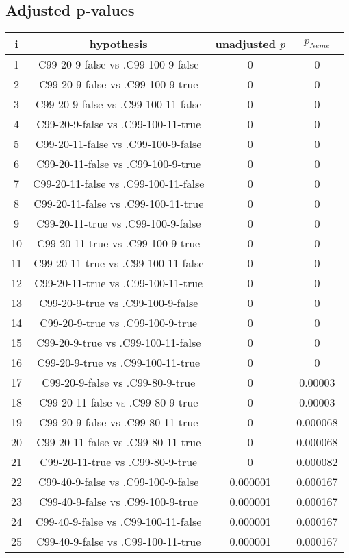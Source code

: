 \documentclass[a4paper,10pt]{article}
\begin{document}
\begin{landscape}
\pagebreak

\subsection{Adjusted p-values}

\begin{table}[!htp]
\centering\scriptsize
\begin{tabular}{cccc}
i&hypothesis&unadjusted $p$&$p_{Neme}$\\
\hline1&C99-20-9-false vs .C99-100-9-false&0&0\\
2&C99-20-9-false vs .C99-100-9-true&0&0\\
3&C99-20-9-false vs .C99-100-11-false&0&0\\
4&C99-20-9-false vs .C99-100-11-true&0&0\\
5&C99-20-11-false vs .C99-100-9-false&0&0\\
6&C99-20-11-false vs .C99-100-9-true&0&0\\
7&C99-20-11-false vs .C99-100-11-false&0&0\\
8&C99-20-11-false vs .C99-100-11-true&0&0\\
9&C99-20-11-true vs .C99-100-9-false&0&0\\
10&C99-20-11-true vs .C99-100-9-true&0&0\\
11&C99-20-11-true vs .C99-100-11-false&0&0\\
12&C99-20-11-true vs .C99-100-11-true&0&0\\
13&C99-20-9-true vs .C99-100-9-false&0&0\\
14&C99-20-9-true vs .C99-100-9-true&0&0\\
15&C99-20-9-true vs .C99-100-11-false&0&0\\
16&C99-20-9-true vs .C99-100-11-true&0&0\\
17&C99-20-9-false vs .C99-80-9-true&0&0.00003\\
18&C99-20-11-false vs .C99-80-9-true&0&0.00003\\
19&C99-20-9-false vs .C99-80-11-true&0&0.000068\\
20&C99-20-11-false vs .C99-80-11-true&0&0.000068\\
21&C99-20-11-true vs .C99-80-9-true&0&0.000082\\
22&C99-40-9-false vs .C99-100-9-false&0.000001&0.000167\\
23&C99-40-9-false vs .C99-100-9-true&0.000001&0.000167\\
24&C99-40-9-false vs .C99-100-11-false&0.000001&0.000167\\
25&C99-40-9-false vs .C99-100-11-true&0.000001&0.000167\\

\end{tabular}
\end{table}
\end{landscape}
\end{document}

